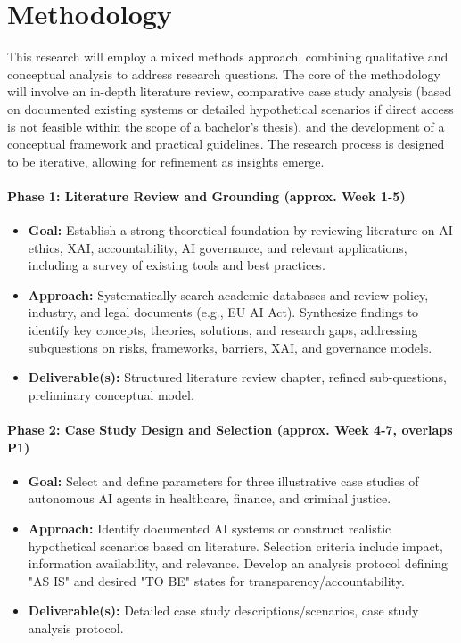 \documentclass[english]{hogent-article}
\begin{document}
\section{Methodology}%
\label{sec:methodology}
This research will employ a mixed methods approach, combining qualitative and conceptual analysis to address research questions. The core of the methodology will involve an in-depth literature review, comparative case study analysis (based on documented existing systems or detailed hypothetical scenarios if direct access is not feasible within the scope of a bachelor's thesis), and the development of a conceptual framework and practical guidelines. The research process is designed to be iterative, allowing for refinement as insights emerge.

\paragraph{Phase 1: Literature Review and Grounding (approx. Week 1-5)}
\begin{itemize}
    \item \textbf{Goal:} Establish a strong theoretical foundation by reviewing literature on AI ethics, XAI, accountability, AI governance, and relevant applications, including a survey of existing tools and best practices.
    \item \textbf{Approach:} Systematically search academic databases and review policy, industry, and legal documents (e.g., EU AI Act). Synthesize findings to identify key concepts, theories, solutions, and research gaps, addressing subquestions on risks, frameworks, barriers, XAI, and governance models.
    \item \textbf{Deliverable(s):} Structured literature review chapter, refined sub-questions, preliminary conceptual model.
\end{itemize}

\paragraph{Phase 2: Case Study Design and Selection (approx. Week 4-7, overlaps P1)}
\begin{itemize}
    \item \textbf{Goal:} Select and define parameters for three illustrative case studies of autonomous AI agents in healthcare, finance, and criminal justice.
    \item \textbf{Approach:} Identify documented AI systems or construct realistic hypothetical scenarios based on literature. Selection criteria include impact, information availability, and relevance. Develop an analysis protocol defining "AS IS" and desired "TO BE" states for transparency/accountability.
    \item \textbf{Deliverable(s):} Detailed case study descriptions/scenarios, case study analysis protocol.
\end{itemize}
\end{document}
